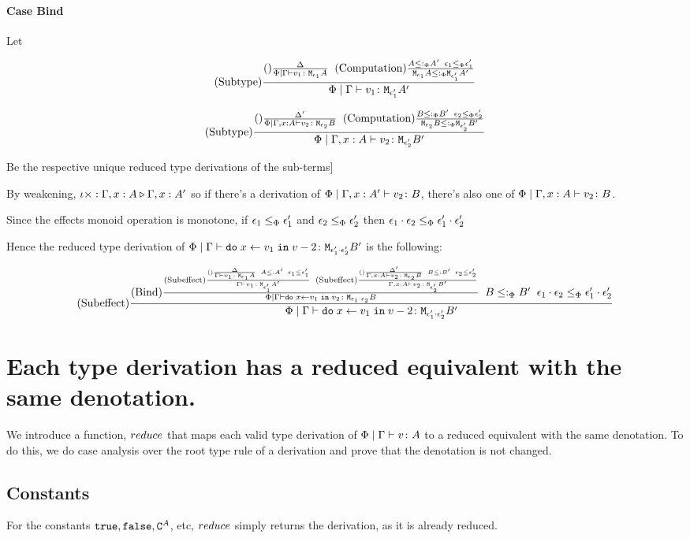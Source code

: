 \documentclass{report}
\newcommand{\edeltacrule}[6]{
            \treerule{Subtype}{
                \treerule{}{
                    \D
                }{
                    \typerelation{\P\mid#1}{#2}{\M{#3}{#4}}
                }
                \s\s
                \treerule{Computation}{
                    #4 \subtypep #6
                    \s\s #3 \subeffectp #5
                }{
                    \M{#3}{#4}\subtypep{\M{#5}{#6}}
                }
            }{
                \typerelation{\P\mid #1}{#2}{\M{#5}{#6}}
            }
        }
\newcommand{\edeltacruleprime}[6]{
            \treerule{Subtype}{
                \treerule{}{
                    \D'
                }{
                    \typerelation{\P\mid #1}{#2}{\M{#3}{#4}}
                }
                \s\s
                \treerule{Computation}{
                    #4 \subtypep #6
                    \s\s #3 \subeffectp #5
                }{
                    \M{#3}{#4}\subtypep{\M{#5}{#6}}
                }
            }{
                \typerelation{\P\mid #1}{#2}{\M{#5}{#6}}
            }
        }
\begin{document}
\paragraph{Case Bind}

Let 

\begin{equation}
    \edeltacrule{\G}{v_1}{\e_1}{A}{\e_1'}{A'}
\end{equation}

\begin{equation}
    \edeltacruleprime{\G, x:A}{v_2}{\e_2}{B}{\e_2'}{B'}
\end{equation}

Be the respective unique reduced type derivations of the sub-terms]

By weakening, $\iota\times : \Gamma, x:A \triangleright \Gamma, x: A'$ so if there's a derivation of $\Phi\mid\Gamma, x:A' \vdash v_2 \colon B$, there's also one of   $\Phi\mid\Gamma, x: A \vdash v_2 \colon B$.

Since the effects monoid operation is monotone, if $\epsilon_1\leq_{\Phi}\epsilon_1'$ and $\epsilon_2\leq_{\Phi}\epsilon_2'$ then $\epsilon_1\cdot\epsilon_2 \leq_{\Phi} \epsilon_1'\cdot\epsilon_2'$

Hence the reduced type derivation of $\Phi\mid\Gamma \vdash \texttt{do}\; x \leftarrow v_1 \;\texttt{in}\; v-2 \colon \texttt{M}_{\epsilon_1'\cdot\epsilon_2'}{B'}$ is the following:

\begin{equation}
    (\text{Subeffect}) \frac{
        (\text{Bind}) \frac{
            (\text{Subeffect}) \frac{(\text{}) \frac{\Delta}{\Gamma \vdash v_1 \colon \texttt{M}_{\epsilon_1}{A}}\;\; A \leq: A'\;\; \epsilon_1 \leq \epsilon_1'}{\Gamma \vdash v_1 \colon \texttt{M}_{\epsilon_1'}{A'}}
            \;\;
            (\text{Subeffect}) \frac{(\text{}) \frac{\Delta'}{\Gamma, x:A \vdash v_2 \colon \texttt{M}_{\epsilon_2}{B}}\;\; B \leq: B'\;\; \epsilon_2 \leq \epsilon_2'}{\Gamma, x:A \vdash v_2 \colon \texttt{M}_{\epsilon_2'}{B'}}
        }{
            \Phi\mid\Gamma \vdash \texttt{do}\; x \leftarrow v_1 \;\texttt{in}\; v_2 \colon \texttt{M}_{\epsilon_1\cdot\epsilon_2}{B}
        }
        \;\;
        B\leq:_\Phi B'
        \;\;
        \epsilon_1\cdot\epsilon_2\leq_{\Phi}\epsilon_1'\cdot\epsilon_2'
    }{
        \Phi\mid\Gamma \vdash \texttt{do}\; x \leftarrow v_1 \;\texttt{in}\; v-2 \colon \texttt{M}_{\epsilon_1'\cdot\epsilon_2'}{B'}
    }
\end{equation}

\section{Each type derivation has a reduced equivalent with the same denotation.}
We introduce a function, $reduce$ that maps each valid type derivation of $\Phi\mid\Gamma \vdash v \colon A$ to a reduced equivalent with the same denotation. To do this, we do case analysis over the root type rule of a derivation and prove that the denotation is not changed.

    \subsection{Constants}
        For the constants $\texttt{true}, \texttt{false}, \texttt{C}^{A}$, etc, $reduce$ simply returns the derivation, as it is already reduced.
\end{document}
